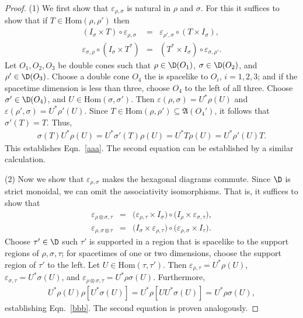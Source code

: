 \documentclass[12pt]{article}
\newcommand{\alg}[1]{\mathfrak{#1}}
\theoremstyle{definition}
\theoremstyle{definition}
\theoremstyle{remark}
\newcommand{\ve}{\varepsilon}
\newcommand{\Hom}{\mathrm{Hom}}
\begin{document}
\begin{proof} (1) We first show that $\ve _{\rho ,\sigma }$ is natural in $\rho$ and
  $\sigma$.  For this it suffices to show that if $T\in \Hom (\rho ,\rho ')$ then
\begin{eqnarray} 
  (I_{\sigma}\times T)\circ \ve _{\rho ,\sigma } &=& \ve _{\rho ',\sigma }\circ
  (T\times I_{\sigma}), \label{aaa} \\ 
  \ve _{\sigma ,\rho }\circ (I_{\sigma}\times T^*)  &=& (T^*\times I_{\sigma})\circ
  \ve _{\sigma ,\rho '} \label{nature}.
\end{eqnarray}
Let $O_1,O_2,O_3$ be double cones such that $\rho \in \D (O_1)$, $\sigma \in \D
(O_2)$, and $\rho '\in \D (O_3)$.  Choose a double cone $O_4$ the is spacelike to
$O_i$, $i=1,2,3$; and if the spacetime dimension is less than three, choose $O_4$ to
the left of all three.  Choose $\sigma '\in \D (O_4)$, and $U\in \Hom (\sigma ,\sigma
')$.  Then $\ve (\rho ,\sigma )=U^*\rho (U)$ and $\ve (\rho ',\sigma )=U^*\rho '(U)$.
Since $T\in \Hom (\rho ,\rho ')\subseteq \alg{A}(O_4')$, it follows that $\sigma
'(T)=T$.  Thus,
\begin{eqnarray*}
  \sigma (T)U^*\rho (U) = U^*\sigma '(T)\rho (U) =U^*T\rho (U)=U^*\rho '(U)T .
\end{eqnarray*}
This establishes Eqn.\ \ref{aaa}.  The second equation can be established by a
similar calculation.

\bigskip (2) Now we show that $\ve _{\rho ,\sigma}$ makes the hexagonal diagrams
commute.  Since $\D$ is strict monoidal, we can omit the associativity isomorphisms.
That is, it suffices to show that
\begin{eqnarray} 
  \ve _{\rho \otimes \sigma ,\tau} &=& \bigl( \ve _{\rho ,\tau }\times I_{\sigma}\bigr) \circ \bigl( I_{\rho }\times \ve
  _{\sigma ,\tau}\bigr) ,\label{bbb} \\
  \ve _{\rho ,\sigma \otimes \tau} &=& \bigl(I_{\sigma}\times \ve _{\rho ,\tau}
  \bigr) \circ \bigl( \ve _{\rho ,\sigma}\times I_{\tau} \bigr) \label{ccc} . 
\end{eqnarray}
Choose $\tau '\in \D$ such $\tau '$ is supported in a region that is spacelike to the
support regions of $\rho ,\sigma ,\tau$; for spacetimes of one or two dimensions,
choose the support region of $\tau '$ to the left.  Let $U\in \Hom (\tau ,\tau ')$.
Then $\ve _{\rho ,\tau}=U^*\rho (U)$, $\ve _{\sigma ,\tau}=U^*\sigma (U)$, and $\ve
_{\rho \otimes \sigma ,\tau}=U^*\rho \sigma (U)$.  Furthermore,
\begin{eqnarray*} U^*\rho (U)\rho [U^*\sigma (U)] = U^*\rho [UU^*\sigma (U)]=U^*\rho
  \sigma (U) ,\end{eqnarray*} establishing Eqn.\ \ref{bbb}.  The second equation is
proven analogously.
\end{proof}
\end{document}
